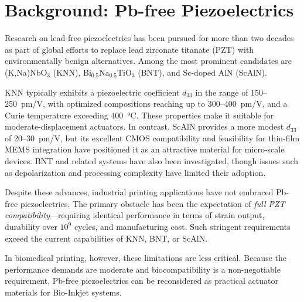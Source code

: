 \section{Background: Pb-free Piezoelectrics}
Research on lead-free piezoelectrics has been pursued for more than two
decades as part of global efforts to replace lead zirconate titanate
(PZT) with environmentally benign alternatives.
Among the most prominent candidates are (K,Na)NbO$_3$ (KNN),
Bi$_{0.5}$Na$_{0.5}$TiO$_3$ (BNT), and Sc-doped AlN (ScAlN).

KNN typically exhibits a piezoelectric coefficient $d_{33}$ in the range
of 150--250~pm/V, with optimized compositions reaching up to
300--400~pm/V, and a Curie temperature exceeding 400~\si{\celsius}.
These properties make it suitable for moderate-displacement actuators.
In contrast, ScAlN provides a more modest $d_{33}$ of
20--30~pm/V, but its excellent CMOS compatibility and feasibility for
thin-film MEMS integration have positioned it as an attractive material
for micro-scale devices.
BNT and related systems have also been investigated, though issues such
as depolarization and processing complexity have limited their adoption.

Despite these advances, industrial printing applications have not
embraced Pb-free piezoelectrics.
The primary obstacle has been the expectation of \textit{full PZT
compatibility}---requiring identical performance in terms of strain
output, durability over $10^9$ cycles, and manufacturing cost.
Such stringent requirements exceed the current capabilities of KNN,
BNT, or ScAlN.

In biomedical printing, however, these limitations are less critical.
Because the performance demands are moderate and biocompatibility is a
non-negotiable requirement, Pb-free piezoelectrics can be reconsidered
as practical actuator materials for Bio-Inkjet systems.
